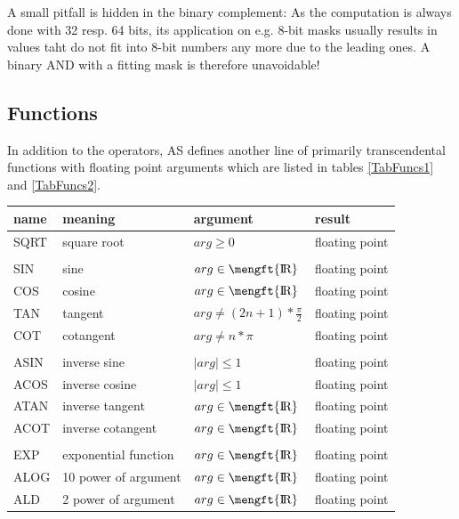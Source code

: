 \documentclass[12pt,twoside]{report}
\newcommand{\asname}{{AS}}
\def \rz{\hbox{\mengft{I \hskip -1.7mm R}}}
\begin{document}
A small pitfall is hidden in the binary complement: As the
computation is always done with 32 resp. 64 bits, its application on
e.g. 8-bit masks usually results in values taht do not fit into 8-bit
numbers any more due to the leading ones.  A binary AND with a
fitting mask is therefore unavoidable!

\subsection{Functions}

In addition to the operators, \asname{} defines another line of
primarily transcendental functions with floating point arguments which are
listed in tables \ref{TabFuncs1} and \ref{TabFuncs2}.
\begin{center}\begin{longtable}{|l|l|l|l|}
\hline
name     & meaning              & argument             & result \\
\hline
\hline
SQRT     & square root          & $arg \geq 0$         & floating point \\
         &                      &                      & \\
SIN      & sine                 & $arg \in \rz$        & floating point \\
COS      & cosine               & $arg \in \rz$        & floating point \\
TAN      & tangent              & $arg \neq (2n+1)*\frac{\pi}{2}$ & floating point \\
COT      & cotangent            & $arg \neq n*\pi$     & floating point \\
         &                      &                      & \\
ASIN     & inverse sine         & $\mid arg \mid \leq 1$ & floating point \\
ACOS     & inverse cosine       & $\mid arg \mid \leq 1$ & floating point \\
ATAN     & inverse tangent      & $arg \in \rz$        & floating point \\
ACOT     & inverse cotangent    & $arg \in \rz$        & floating point \\
         &                      &                      & \\
EXP      & exponential function & $arg \in \rz$        & floating point \\
ALOG     & 10 power of argument & $arg \in \rz$        & floating point \\
ALD      & 2 power of argument  & $arg \in \rz$        & floating point \\

\end{longtable}
\end{center}
\end{document}

